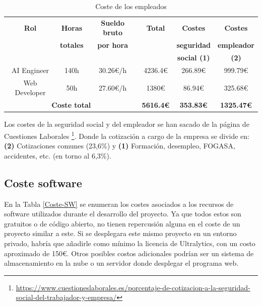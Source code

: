 \documentclass[12pt,a4paper,onecolumn,oneside]{report}
\begin{document}
\begin{table}[ht]
    \centering
    \caption{Coste de los empleados}
    \begin{tabular}{|c|c|c|c|c|c|}
        \hline
        \textbf{Rol} & \textbf{Horas} & \textbf{Sueldo bruto} & \textbf{Total} & \textbf{Costes } & \textbf{Costes}\\
        & \textbf{totales} & \textbf{por hora} & & \textbf{seguridad} & \textbf{empleador}\\
        & & & & \textbf{social (1)} & \textbf{(2)}\\
        \hline
        AI Engineer & 140h & 30.26€/h & 4236.4€ & 266.89€ & 999.79€\\ 
        \hline
        Web Developer & 50h & 27.60€/h & 1380€ & 86.94€ & 325.68€\\
        \hline
        \multicolumn{3}{|c|}{\textbf{Coste total}} & \textbf{5616.4€} & \textbf{353.83€} & \textbf{1325.47€}\\
        \hline
    \end{tabular}
    \label{Coste-Personal}
\end{table}

Los costes de la seguridad social y del empleador se han sacado de la página de Cuestiones Laborales \footnote{\url{https://www.cuestioneslaborales.es/porcentaje-de-cotizacion-a-la-seguridad-social-del-trabajador-y-empresa/}}. Donde la cotización a cargo de la empresa se divide en: \textbf{(2)} Cotizaciones comunes (23,6\%) y \textbf{(1)} Formación, desempleo, FOGASA, accidentes, etc. (en torno al 6,3\%).

\subsection{Coste software}

En la Tabla \ref{Coste-SW} se enumeran los costes asociados a los recursos de software utilizados durante el desarrollo del proyecto. Ya que todos estos son gratuitos o de código abierto, no tienen repercusión alguna en el coste de un proyecto similar a este. Si se desplegara este mismo proyecto en un entorno privado, habría que añadirle como mínimo la licencia de Ultralytics, con un costo aproximado de 150€. Otros posibles costos adicionales podrían ser un sistema de almacenamiento en la nube o un servidor donde desplegar el programa web.
\end{document}
